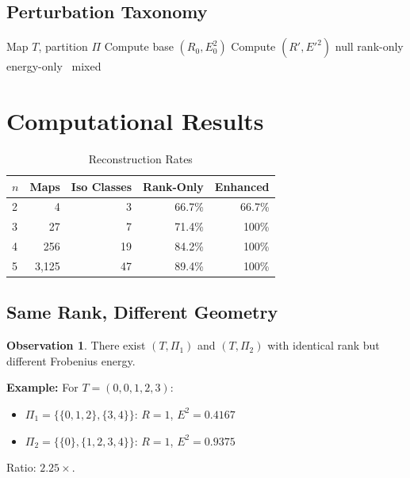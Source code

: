 \documentclass[11pt]{article}
\theoremstyle{definition}
\newtheorem{observation}{Observation}
\begin{document}
\subsection{Perturbation Taxonomy}

\begin{algorithm}
\caption{Perturbation Taxonomy}
\begin{algorithmic}
\Require Map $T$, partition $\Pi$
\State Compute base $(R_0, E_0^2)$
    \State Compute $(R', E'^2)$
     \State null
     \State rank-only
     \State energy-only
    \Else\ \State mixed
    \EndIf
\EndFor
\end{algorithmic}
\end{algorithm}

\section{Computational Results}

\begin{table}[h]
\centering
\caption{Reconstruction Rates}
\begin{tabular}{lrrrr}
\toprule
$n$ & Maps & Iso Classes & Rank-Only & Enhanced \\
\midrule
2 & 4 & 3 & 66.7\% & 66.7\% \\
3 & 27 & 7 & 71.4\% & 100\% \\
4 & 256 & 19 & 84.2\% & 100\% \\
5 & 3,125 & 47 & 89.4\% & 100\% \\
\bottomrule
\end{tabular}
\end{table}

\subsection{Same Rank, Different Geometry}

\begin{observation}
There exist $(T, \Pi_1)$ and $(T, \Pi_2)$ with identical rank but different Frobenius energy.
\end{observation}

\textbf{Example:} For $T = (0,0,1,2,3)$:
\begin{itemize}
\item $\Pi_1 = \{\{0,1,2\},\{3,4\}\}$: $R=1$, $E^2 = 0.4167$
\item $\Pi_2 = \{\{0\},\{1,2,3,4\}\}$: $R=1$, $E^2 = 0.9375$
\end{itemize}
Ratio: $2.25\times$.
\end{document}
